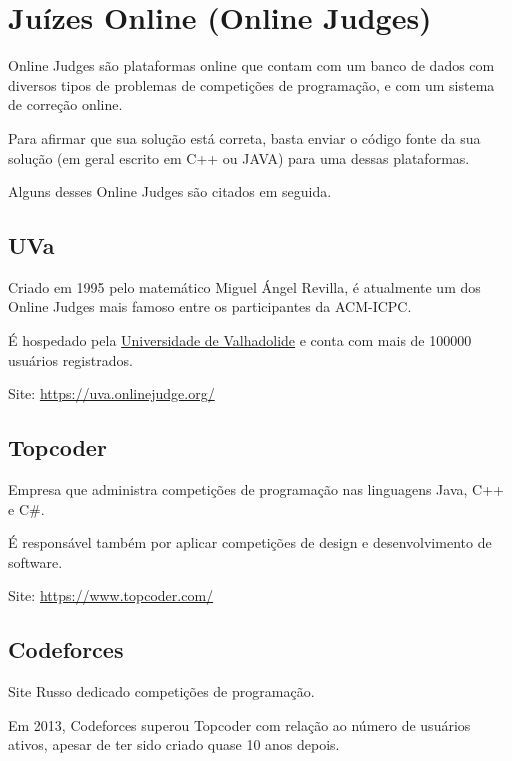 
\chapter{Juízes Online (Online Judges)} %

\label{AppendixB} %

Online Judges são plataformas online que contam com um banco de dados com diversos tipos de problemas de competições de programação, e com um sistema de correção online.

Para afirmar que sua solução está correta, basta enviar o código fonte da sua solução (em geral escrito em C++ ou JAVA) para uma dessas plataformas.

Alguns desses Online Judges são citados em seguida.

\section{UVa} 
	
Criado em 1995 pelo matemático Miguel Ángel Revilla, é atualmente um dos Online Judges mais famoso entre os participantes da ACM-ICPC.

É hospedado pela \href{http://www.uva.es/export/sites/uva/}{Universidade de Valhadolide} e conta com mais de 100000 usuários registrados.

Site: \href{https://uva.onlinejudge.org/}{https://uva.onlinejudge.org/}

\section{Topcoder} 

Empresa que administra competições de programação nas linguagens Java, C++ e C$\#$.

É responsável também por aplicar competições de design e desenvolvimento de software.

Site: \href{https://www.topcoder.com/}{https://www.topcoder.com/}

\section{Codeforces}

Site Russo dedicado competições de programação. 

Em 2013, Codeforces superou Topcoder com relação ao número de usuários ativos, apesar de ter sido criado quase 10 anos depois.

